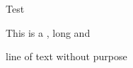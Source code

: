 \documentclass{beamer}
\begin{document}
\begin{frame}{Test}
  \begin{block}{}
    This is a , \alert{long} and  

    line of text without purpose
  \end{block}
\end{frame}
\end{document}

